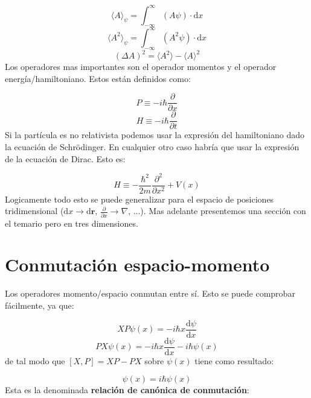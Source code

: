 \documentclass[12pt,a4paper]{book}
\numberwithin{equation}{chapter}
\numberwithin{figure}{chapter}
\newcommand{\parentesis}[1]{\left( #1  \right)}
\newcommand{\parciales}[2]{\frac{\partial #1}{\partial #2}}
\newcommand{\D}{\mathrm{d}}
\newcommand{\derivadas}[2]{\frac{\D #1}{\D #2}}
\newcommand{\intinf}{\int_{-\infty}^{\infty}}
\newcommand{\rn}{\mathbf{r}}
\begin{document}
\begin{equation}
\langle A \rangle_\psi = \intinf \parentesis{A \psi}  \cdot \D x  
\end{equation}
\begin{equation}
\langle A^2 \rangle_\psi = \intinf \parentesis{A^2 \psi}  \cdot \D x 
\end{equation}
\begin{equation}
(\Delta A)^2 = \langle A^2 \rangle - \langle A \rangle^2
\end{equation}
Los operadores mas importantes son el operador momentos y el operador energía/hamiltoniano. Estos están definidos como:

\begin{equation}
P \equiv - i \hbar \parciales{}{x}
\end{equation}
\begin{equation}
H \equiv - i  \hbar \parciales{}{t} 
\end{equation}
Si la partícula es no relativista podemos usar la expresión del hamiltoniano dado la ecuación de Schrödinger. En cualquier otro caso habría que usar la expresión de la ecuación de Dirac. Esto es:

\begin{equation}
H \equiv -\frac{\hbar^2}{2m} \parciales{^2}{x^2} + V(x)
\end{equation}
Logicamente todo esto se puede generalizar para el espacio de posiciones tridimensional ($\D x \rightarrow \D \rn$, $\parciales{}{x}  \rightarrow \nabla$, ...). Mas adelante presentemos una sección con el temario pero en tres dimensiones.


\section{Conmutación espacio-momento}

Los operadores momento/espacio conmutan entre sí. Esto se puede comprobar fácilmente, ya que:

\begin{equation}
XP \psi (x) = - i \hbar x \derivadas{\psi}{x}
\end{equation}
\begin{equation}
PX \psi (x) = - i \hbar x \derivadas{\psi}{x} - i \hbar \psi(x)
\end{equation}
de tal modo que $[X,P]=XP-PX$ sobre $\psi(x)$ tiene como resultado:

\begin{equation}
[X,P] \psi (x) =  i \hbar \psi (x)
\end{equation}
Esta es la denominada \textbf{relación de canónica de conmutación}:
\end{document}
